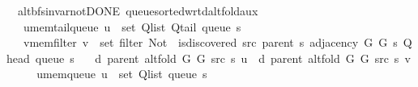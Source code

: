 \begin{isabellebody}
{}
\isamarkuptrue%
%
\endisatagdocument
{\isafolddocument}%
%
\isadelimdocument
%
\endisadelimdocument
{}\isamarkupfalse%
\ {\isacharparenleft}{\kern0pt}\ alt{\isacharunderscore}{\kern0pt}bfs{\isacharunderscore}{\kern0pt}invar{\isacharunderscore}{\kern0pt}not{\isacharunderscore}{\kern0pt}DONE{\isacharparenright}{\kern0pt}\ queue{\isacharunderscore}{\kern0pt}sorted{\isacharunderscore}{\kern0pt}wrt{\isacharunderscore}{\kern0pt}d{\isacharunderscore}{\kern0pt}alt{\isacharunderscore}{\kern0pt}fold{\isacharunderscore}{\kern0pt}aux{\isacharcolon}{\kern0pt}\isanewline
\ \ \ u{\isacharunderscore}{\kern0pt}mem{\isacharunderscore}{\kern0pt}tail{\isacharunderscore}{\kern0pt}queue{\isacharcolon}{\kern0pt}\ {\isachardoublequoteopen}u\ {\isasymin}\ set\ {\isacharparenleft}{\kern0pt}Q{\isacharunderscore}{\kern0pt}list\ {\isacharparenleft}{\kern0pt}Q{\isacharunderscore}{\kern0pt}tail\ {\isacharparenleft}{\kern0pt}queue\ s{\isacharparenright}{\kern0pt}{\isacharparenright}{\kern0pt}{\isacharparenright}{\kern0pt}{\isachardoublequoteclose}\isanewline
\ \ \ v{\isacharunderscore}{\kern0pt}mem{\isacharunderscore}{\kern0pt}filter{\isacharcolon}{\kern0pt}\ {\isachardoublequoteopen}v\ {\isasymin}\ set\ {\isacharparenleft}{\kern0pt}filter\ {\isacharparenleft}{\kern0pt}Not\ {\isasymcirc}\ is{\isacharunderscore}{\kern0pt}discovered\ src\ {\isacharparenleft}{\kern0pt}parent\ s{\isacharparenright}{\kern0pt}{\isacharparenright}{\kern0pt}\ {\isacharparenleft}{\kern0pt}adjacency\ G{}\ G{}\ s\ {\isacharparenleft}{\kern0pt}Q{\isacharunderscore}{\kern0pt}head\ {\isacharparenleft}{\kern0pt}queue\ s{\isacharparenright}{\kern0pt}{\isacharparenright}{\kern0pt}{\isacharparenright}{\kern0pt}{\isacharparenright}{\kern0pt}{\isachardoublequoteclose}\isanewline
\ \ \ {\isachardoublequoteopen}d\ {\isacharparenleft}{\kern0pt}parent\ {\isacharparenleft}{\kern0pt}alt{\isacharunderscore}{\kern0pt}fold\ G{}\ G{}\ src\ s{\isacharparenright}{\kern0pt}{\isacharparenright}{\kern0pt}\ u\ {\isasymle}\ d\ {\isacharparenleft}{\kern0pt}parent\ {\isacharparenleft}{\kern0pt}alt{\isacharunderscore}{\kern0pt}fold\ G{}\ G{}\ src\ s{\isacharparenright}{\kern0pt}{\isacharparenright}{\kern0pt}\ v{\isachardoublequoteclose}\isanewline
%
\isadelimproof
%
\endisadelimproof
%
\isatagproof
{}\isamarkupfalse%
\ {\isacharminus}{\kern0pt}\isanewline
\ \ \isamarkupfalse%
\ u{\isacharunderscore}{\kern0pt}mem{\isacharunderscore}{\kern0pt}queue{\isacharcolon}{\kern0pt}\ {\isachardoublequoteopen}u\ {\isasymin}\ set\ {\isacharparenleft}{\kern0pt}Q{\isacharunderscore}{\kern0pt}list\ {\isacharparenleft}{\kern0pt}queue\ s{\isacharparenright}{\kern0pt}{\isacharparenright}{\kern0pt}{\isachardoublequoteclose}\isanewline

\end{isabellebody}
